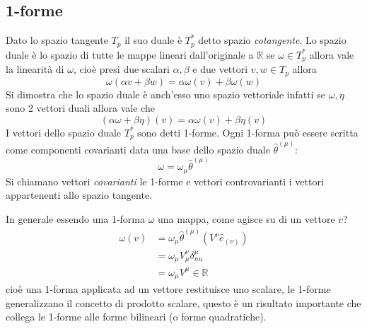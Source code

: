 \documentclass[twoside]{article}
\begin{document}
\subsection{1-forme}
Dato lo spazio tangente $T_p$ il suo duale è $T_p^*$ detto spazio \emph{cotangente}. Lo spazio duale è lo spazio di tutte le mappe lineari dall'originale a $\mathbb{R}$ se $\omega \in T_p^*$ allora vale la linearità di $\omega$, cioè presi due scalari $\alpha,\beta$ e due vettori $v,w \in T_p$ allora
\begin{equation}
	\omega (\alpha v + \beta w ) = \alpha \omega(v) + \beta \omega(w)
\end{equation}
Si dimostra che lo spazio duale è anch'esso uno spazio vettoriale infatti se $\omega, \eta$ sono 2 vettori duali allora vale che 
\begin{equation}
(\alpha \omega + \beta \eta) (v) = \alpha \omega(v) + \beta \eta(v)
\end{equation}
I vettori dello spazio duale $T_p^*$ sono detti 1-forme. Ogni 1-forma può essere scritta come componenti covarianti data una base dello spazio duale $\hat{\theta}^{(\mu)}$:
\begin{equation}
	\omega = \omega_\mu \hat{\theta}^{(\mu)}
\end{equation}
Si chiamano vettori \emph{covarianti} le 1-forme e vettori controvarianti i vettori appartenenti allo spazio tangente.

In generale essendo una 1-forma $\omega$ una mappa, come agisce su di un vettore $v$?
\begin{align*}
	\omega(v) & =  \omega_\mu \hat{\theta}^{(\mu)}(V^\nu \hat{e}_{(\nu)}) \\
	& = \omega_\mu V_{\mu}^\nu \delta_{nu}^\mu \\
	& = \omega_\mu V^\mu \in \mathbb{R}
\end{align*}
cioè una 1-forma applicata ad un vettore restituisce uno scalare, le 1-forme generalizzano il concetto di prodotto scalare, questo è un risultato importante che collega le 1-forme alle forme bilineari (o forme quadratiche).
\end{document}
